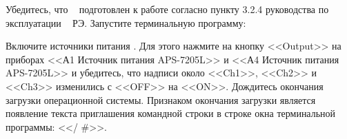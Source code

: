 
  \subpoint Убедитесь, что \DocStendShortTitle~ подготовлен к работе согласно пункту 3.2.4 руководства по эксплуатации \DocStendSignature~ РЭ.
  \subpoint Запустите терминальную программу:
    
  \subpoint Включите источники питания \DocStendShortTitle. Для этого нажмите на кнопку <<Output>> на приборах  <<А1 Источник питания APS-7205L>> и <<А4 Источник питания APS-7205L>> 
	и убедитесь, что надписи около <<Ch1>>, <<Ch2>> и <<Ch3>> изменились с <<OFF>> на <<ON>>.
  \subpoint Дождитесь окончания загрузки операционной системы. Признаком окончания загрузки является появление текста приглашения командной строки в строке окна терминальной программы: <</ \#>>.
